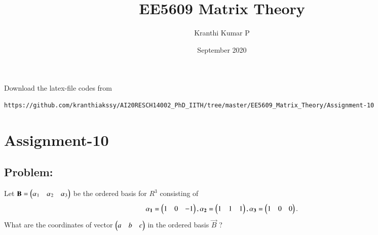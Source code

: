\documentclass[journal,12pt,twocolumn]{IEEEtran}
\begin{document}
     \def\rightbox#1{\makebox[0in][r]{#1}}
     \def\centbox#1{\makebox[0in]{#1}}
     \def\topbox#1{\raisebox{-\baselineskip}[0in][0in]{#1}}
     \def\midbox#1{\raisebox{-0.5\baselineskip}[0in][0in]{#1}}
\vspace{3cm}
\title{EE5609 Matrix Theory}
\author{Kranthi Kumar P}
\date{September 2020}
\maketitle
\newpage
\bigskip
\renewcommand{\thefigure}{\theenumi}
\renewcommand{\thetable}{\theenumi}

Download the latex-file codes from 
%
\begin{lstlisting}
https://github.com/kranthiakssy/AI20RESCH14002_PhD_IITH/tree/master/EE5609_Matrix_Theory/Assignment-10
\end{lstlisting}
\section*{Assignment-10}
\subsection*{Problem:}
Let $\mathbf{B} = \begin{pmatrix}\alpha_1&\alpha_2&\alpha_3\end{pmatrix}$ be the ordered basis for $R^3$ consisting of 
$$\mathbf{\alpha_1} = \begin{pmatrix}1&0&-1\end{pmatrix}, \mathbf{\alpha_2} = \begin{pmatrix}1&1&1\end{pmatrix}, \mathbf{\alpha_3} = \begin{pmatrix}1&0&0\end{pmatrix}.$$
What are the coordinates of vector $\begin{pmatrix}a&b&c\end{pmatrix}$ in the ordered basis $\vec{B}$ ?
\end{document}
